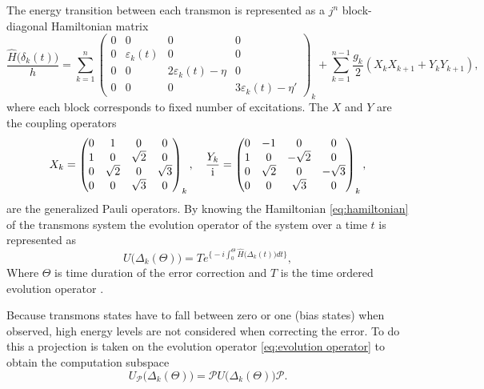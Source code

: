 The energy transition between each transmon is represented as a $j^n$ block-diagonal Hamiltonian matrix
\begin{equation}
  \label{eq:hamiltonian}
  \frac{\hat{H}\big(\delta_k(t)\big)}{h} = \sum^n_{k=1} \begin{pmatrix} 0&0& 0&0\\0&\varepsilon_k(t)&0&0\\0&0&2\varepsilon_k(t)-\eta&0\\0&0&0&3\varepsilon_k(t)-\eta'\end{pmatrix}_{k}  + \sum^{n-1}_{k=1} \frac{g_k}{2}(X_kX_{k+1}+Y_{k}Y_{k+1}),  
\end{equation}
where each block corresponds to fixed number of excitations. The $X$ and $Y$ are the coupling operators \cite{Ghosh2013}
\begin{align}
    \label{eq: coupling operators}
       X_k=\begin{pmatrix} 0&1& 0&0\\1&0&\sqrt{2}&0\\0&\sqrt{2}&0&\sqrt{3}\\0&0&\sqrt{3}&0\end{pmatrix}_{k}, \quad
  \frac{Y_k}{\text i}
  =\begin{pmatrix} 0&-1& 0&0\\1&0&-\sqrt{2}&0\\0&\sqrt{2}&0&-\sqrt{3}\\0&0&\sqrt{3}&0\end{pmatrix}_{k}, 
\end{align}
are the generalized Pauli operators.
By knowing the Hamiltonian \eqref{eq:hamiltonian} of the transmons system the evolution operator of the system over a time $t$ is represented as
\begin{equation}
  \label{eq:evolution operator}
  U\big( \Delta_k(\Theta) \big) = T e^{\Big\{ -i \int_{0}^{\Theta} \hat{H}\big( \Delta_k(t) \big) dt \Big\} }, 
\end{equation}
Where $\Theta$ is time duration of the error correction and $T$ is the time ordered evolution operator \cite{}. 

Because transmons states have to fall between zero or one (bias states) when observed, high energy levels are not considered when correcting the error. To do this a projection is taken on the evolution operator \eqref{eq:evolution operator} to obtain the computation subspace
\begin{equation}
    \label{eq:projected}
    U_{\mathscr{P}} \big(\Delta_k (\Theta) \big) =  \mathscr{P} U \big(\Delta_k(\Theta) \big) \mathscr{P}.
\end{equation}

